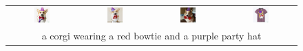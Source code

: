 \begin{figure}[ht!]
\begin{tabular}{cccc}
        \includegraphics[width=0.24\textwidth]{figures/cross/corgi_0.jpg} &
        \includegraphics[width=0.24\textwidth]{figures/cross/corgi_1.jpg} &
        \includegraphics[width=0.24\textwidth]{figures/cross/corgi_2.jpg} &
        \includegraphics[width=0.24\textwidth]{figures/cross/corgi_3.jpg} \vspace{-1mm}\\
        \multicolumn{4}{c}{\small a corgi wearing a red bowtie and a purple party hat}\\
        

\end{tabular}
\end{figure}
